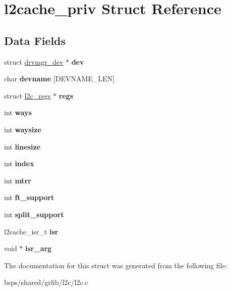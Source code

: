 \hypertarget{structl2cache__priv}{}\section{l2cache\+\_\+priv Struct Reference}
\label{structl2cache__priv}
\subsection*{Data Fields}
\begin{DoxyCompactItemize}
\item 
\mbox{\label{structl2cache__priv_a616b414c30ad56089887ca1b65092371}} 
struct \mbox{\hyperlink{structdrvmgr__dev}{drvmgr\+\_\+dev}} $\ast$ {\bfseries dev}
\item 
\mbox{\label{structl2cache__priv_afc9511565db92cc56d33bd73531ca333}} 
char {\bfseries devname} \mbox{[}D\+E\+V\+N\+A\+M\+E\+\_\+\+L\+EN\mbox{]}
\item 
\mbox{\label{structl2cache__priv_adf4acb052e29e9ff97c94b9398b840d0}} 
struct \mbox{\hyperlink{structl2c__regs}{l2c\+\_\+regs}} $\ast$ {\bfseries regs}
\item 
\mbox{\label{structl2cache__priv_aeddddb90e4e88904b8007158f3361df1}} 
int {\bfseries ways}
\item 
\mbox{\label{structl2cache__priv_a51fcc155ac561399956bf64a05576cc6}} 
int {\bfseries waysize}
\item 
\mbox{\label{structl2cache__priv_a7ec243cd488903cc346f4b1b0aa38528}} 
int {\bfseries linesize}
\item 
\mbox{\label{structl2cache__priv_a94d3b7a6bb28371f3167ebd7e4838b9b}} 
int {\bfseries index}
\item 
\mbox{\label{structl2cache__priv_a452b194a6831b481b37679cc77e7cf49}} 
int {\bfseries mtrr}
\item 
\mbox{\label{structl2cache__priv_a1694f49438250ba20edc1bacfc74e7d2}} 
int {\bfseries ft\+\_\+support}
\item 
\mbox{\label{structl2cache__priv_ad9ee87875d346147ff4c2a7bfa90d255}} 
int {\bfseries split\+\_\+support}
\item 
\mbox{\label{structl2cache__priv_a3bea4ff7a11881b2dd933b6ffdee8361}} 
l2cache\+\_\+isr\+\_\+t {\bfseries isr}
\item 
\mbox{\label{structl2cache__priv_ae7451d7dea5f08136185241f9e2ee90d}} 
void $\ast$ {\bfseries isr\+\_\+arg}
\end{DoxyCompactItemize}


The documentation for this struct was generated from the following file\+:\begin{DoxyCompactItemize}
\item 
bsps/shared/grlib/l2c/l2c.\+c\end{DoxyCompactItemize}
